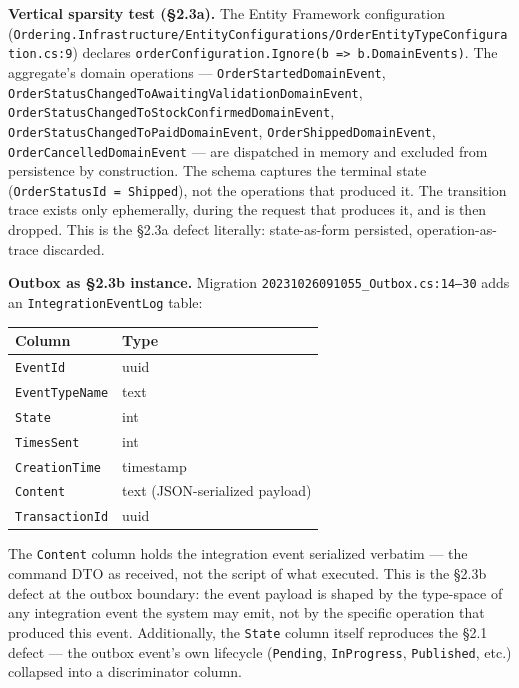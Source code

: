 \documentclass[
]{article}
\newcounter{none} %
\let\origtexttt\texttt%
\renewcommand{\texttt}[1]{\origtexttt{\seqsplit{#1}}}%
\let\texttt\origtexttt%
\begin{document}
\textbf{Vertical sparsity test (§2.3a).} The Entity Framework
configuration
(\texttt{Ordering.Infrastructure/EntityConfigurations/OrderEntityTypeConfiguration.cs:9})
declares
\texttt{orderConfiguration.Ignore(b\ =\textgreater{}\ b.DomainEvents)}.
The aggregate's domain operations --- \texttt{OrderStartedDomainEvent},
\texttt{OrderStatusChangedToAwaitingValidationDomainEvent},
\texttt{OrderStatusChangedToStockConfirmedDomainEvent},
\texttt{OrderStatusChangedToPaidDomainEvent},
\texttt{OrderShippedDomainEvent}, \texttt{OrderCancelledDomainEvent} ---
are dispatched in memory and excluded from persistence by construction.
The schema captures the terminal state
(\texttt{OrderStatusId\ =\ Shipped}), not the operations that produced
it. The transition trace exists only ephemerally, during the request
that produces it, and is then dropped. This is the §2.3a defect
literally: state-as-form persisted, operation-as-trace discarded.

\textbf{Outbox as §2.3b instance.} Migration
\texttt{20231026091055\_Outbox.cs:14–30} adds an
\texttt{IntegrationEventLog} table:

{\def\LTcaptype{none} %
\begin{longtable}[]{@{}ll@{}}
\toprule\noalign{}
Column & Type \\
\midrule\noalign{}
\endhead
\bottomrule\noalign{}
\endlastfoot
\texttt{EventId} & uuid \\
\texttt{EventTypeName} & text \\
\texttt{State} & int \\
\texttt{TimesSent} & int \\
\texttt{CreationTime} & timestamp \\
\texttt{Content} & text (JSON-serialized payload) \\
\texttt{TransactionId} & uuid \\
\end{longtable}
}

The \texttt{Content} column holds the integration event serialized
verbatim --- the command DTO as received, not the script of what
executed. This is the §2.3b defect at the outbox boundary: the event
payload is shaped by the type-space of any integration event the system
may emit, not by the specific operation that produced this event.
Additionally, the \texttt{State} column itself reproduces the §2.1
defect --- the outbox event's own lifecycle (\texttt{Pending},
\texttt{InProgress}, \texttt{Published}, etc.) collapsed into a
discriminator column.
\end{document}
